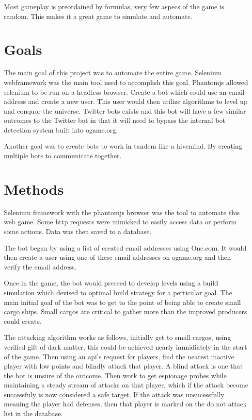 \documentclass[twoside,twocolumn]{article}
\begin{document}
Most gameplay is preordained by formulas, very few aspecs of the game is random.
This makes it a great game to simulate and automate.



\section{Goals}

The main goal of this project was to automate the entire game.  Selenium webframework
was the main tool used to accomplish this goal. Phantomjs allowed selenium to be run
on a headless browser.  Create a bot which could use an email address and
create a new user.  This user would then utilize algorithms to level up and conquor the
universe.  Twitter bots exists and this bot will have a few similar outcomes to the Twitter
bot in that it will need to bypass the internal bot detection system built into ogame.org.

Another goal was to create bots to work in tandem like a hivemind.  By creating
multiple bots to communicate together.


\section{Methods}

Selenium framework with the phantomjs browser was the tool to automate this web game.
Some http requests were mimicked to easily access data or perform some actions.
Data was then saved to a database.

The bot began by using a list of created email addresses using One.com.  It would then
create a user using one of these email addresses on ogame.org and then verify the email
address.

Once in the game, the bot would preceed to develop levels using a build simulation which
devised to optimal build strategy for a perticular goal.  The main initial goal of the
bot was to get to the point of being able to create small cargo ships.  Small cargos
are critical to gather more than the improved producers could create.

The attacking algorithm works as follows, initially get to small cargos, using verified
gift of dark matter, this could be achieved nearly immidiately in the start of the game.
Then using an api's request for players, find the nearest inactive player with low points
and blindly attack that player.  A blind attack is one that the bot is unsure of the outcome.
Then work to get espionage probes while maintaining a steady stream of attacks on that player,
which if the attack become successfuly is now considered a safe target.  If the attack
was unsucessfully meaning the player had defenses, then that player is marked on the do not
attack list in the database.
\end{document}
